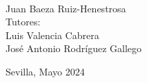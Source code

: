 \begin{titlepage}
\begin{minipage}{14cm}
\HRule \\[2cm]


{\LARGE
	Juan Baeza Ruiz-Henestrosa} \\[1.5cm]

{\large
	Tutores:\\[0.5cm]
	Luis Valencia Cabrera\\
	José Antonio Rodríguez Gallego \\[1.5cm]
}


{\large
Sevilla, Mayo 2024
}

\end{minipage}

\vfill %

\cleardoublepage
\thispagestyle{empty}
\end{titlepage}

\raggedbottom

